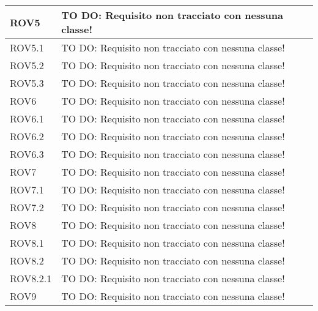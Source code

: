 \begin{center}
\begin{longtable}{| p{2.5cm} | p{11cm} |}
\hline
ROV5 & TO DO: Requisito non tracciato con nessuna classe! \\
\hline
ROV5.1 & TO DO: Requisito non tracciato con nessuna classe! \\
\hline
ROV5.2 & TO DO: Requisito non tracciato con nessuna classe! \\
\hline
ROV5.3 & TO DO: Requisito non tracciato con nessuna classe! \\
\hline
ROV6 & TO DO: Requisito non tracciato con nessuna classe! \\
\hline
ROV6.1 & TO DO: Requisito non tracciato con nessuna classe! \\
\hline
ROV6.2 & TO DO: Requisito non tracciato con nessuna classe! \\
\hline
ROV6.3 & TO DO: Requisito non tracciato con nessuna classe! \\
\hline
ROV7 & TO DO: Requisito non tracciato con nessuna classe! \\
\hline
ROV7.1 & TO DO: Requisito non tracciato con nessuna classe! \\
\hline
ROV7.2 & TO DO: Requisito non tracciato con nessuna classe! \\
\hline
ROV8 & TO DO: Requisito non tracciato con nessuna classe! \\
\hline
ROV8.1 & TO DO: Requisito non tracciato con nessuna classe! \\
\hline
ROV8.2 & TO DO: Requisito non tracciato con nessuna classe! \\
\hline
ROV8.2.1 & TO DO: Requisito non tracciato con nessuna classe! \\
\hline
ROV9 & TO DO: Requisito non tracciato con nessuna classe! \\
\hline
\end{longtable}
\egroup
\end{center}
